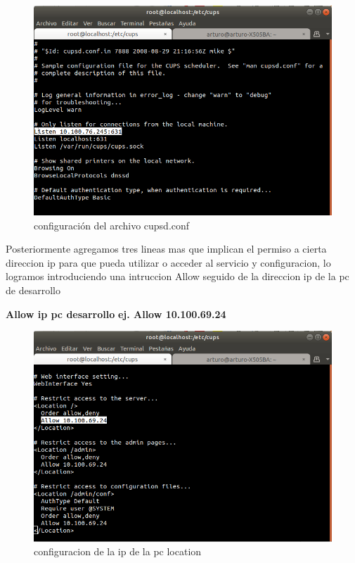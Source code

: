 \FloatBarrier
\begin{figure}[htbp!]
		\centering
			\includegraphics[width=.9\textwidth]{images/r5}
		\caption{configuración del archivo cupsd.conf}
		\label{image:r}
\end{figure}
\FloatBarrier
Posteriormente agregamos tres lineas mas que implican el permiso a cierta direccion ip para que pueda utilizar o acceder al servicio y configuracion, lo logramos introduciendo una intruccion Allow seguido de la direccion ip de la pc de desarrollo
\\
\begin{center}
						\textbf{Allow ip pc desarrollo}
						\textbf{ej. Allow 10.100.69.24}
\end {center}
\FloatBarrier
\begin{figure}[htbp!]
		\centering
			\includegraphics[width=.9\textwidth]{images/r6_1}
		\caption{configuracion de la ip de la pc location}
		\label{image:r6_1}
\end{figure}
\FloatBarrier

